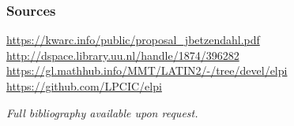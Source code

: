 \documentclass[aspectratio=169, usenames, dvipsnames]{beamer}
\begin{document}
\begin{frame}
\frametitle{Sources}
\vfill
\begin{center}
\url{https://kwarc.info/public/proposal_jbetzendahl.pdf}\\
\url{http://dspace.library.uu.nl/handle/1874/396282}\\
\url{https://gl.mathhub.info/MMT/LATIN2/-/tree/devel/elpi}
\url{https://github.com/LPCIC/elpi}
\bigskip

\emph{Full bibliography available upon request.}
\end{center}
\vfill
\end{frame}
\end{document}
